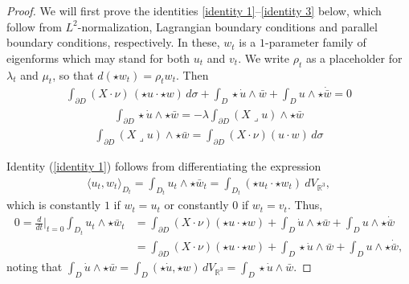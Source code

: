 \documentclass[11pt,reqno]{amsart}
\newcommand{\iprod}{\mathbin{\lrcorner}}
\begin{document}
\begin{proof}
We will first prove the identities \eqref{identity 1}--\eqref{identity 3} below, which follow from $L^2$-normalization, Lagrangian boundary conditions and parallel boundary conditions, respectively. In these, $w_t$ is a $1$-parameter family of eigenforms which may stand for both $u_t$ and $v_t$. We write $\rho_t$ as a placeholder for $\lambda_t$ and $\mu_t$, so that $d ( \star w_t ) = \rho_t w_t$. Then
\begin{align}\label{identity 1}
    \int_{\partial D} (X\cdot \nu)\,( \star u \cdot \star w)\,d\sigma + \int_{D} \star \Dot{u}\wedge \bar w +\int_{D} u\wedge \star \Dot{\bar w} =0
\end{align}
\begin{align}\label{identity 2}
    \int_{\partial D}\star\dot{u}\wedge\star \bar w= - \lambda \int_{\partial D} (X\iprod u) \wedge \star \bar w
\end{align}
\begin{align}\label{identity 3}
    \int_{\partial D} (X \iprod u) \wedge \star \bar w=\int_{\partial D} (X\cdot \nu) (u \cdot w)\,d\sigma
\end{align}

Identity (\ref{identity 1}) follows from differentiating the expression
\begin{align*}
\langle u_t,w_t\rangle_{D_t} = \int_{ D_t}u_t\wedge \star \bar w_t = \int_{D_t} (\star u_t \cdot \star w_t) \ dV_{\mathbb R^3},
\end{align*}
which is constantly $1$ if $w_t = u_t$ or constantly $0$ if $w_t = v_t$. Thus,
\begin{align*}
    0 = \frac{d}{dt}\lvert_{t=0} \int_{ D_t} u_t \wedge \star \bar w_t &= \int_{\partial D} (X \cdot \nu) (\star u \cdot \star w) + \int_{D} \dot u \wedge \star \bar w + \int_D u \wedge \star \dot{\bar w} \\
    &= \int_{\partial D} (X \cdot \nu) (\star u \cdot \star w) + \int_{D} \star \dot u \wedge \bar w + \int_D u \wedge \star \dot{\bar w},
\end{align*}
noting that $\int_D \dot u \wedge \star {\bar w} = \int_D (\star \dot u, \star w) \, dV_{\mathbb R^3} = \int_D \star \dot u \wedge \bar w$.



\end{proof}
\end{document}
